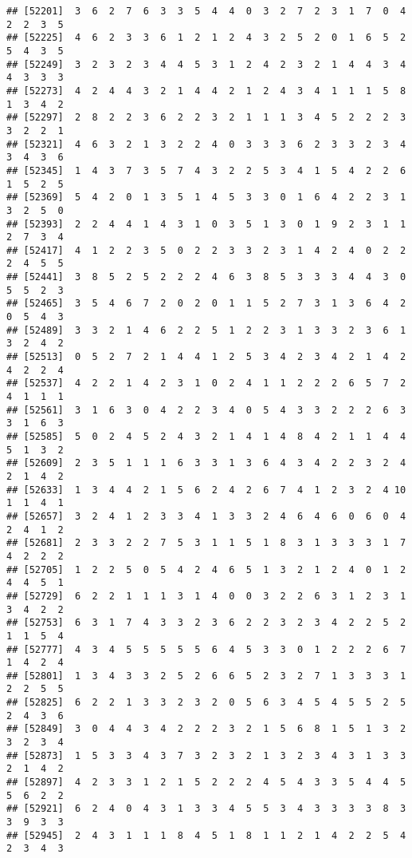 \documentclass[
]{article}
\begin{document}
\begin{verbatim}
## [52201]  3  6  2  7  6  3  3  5  4  4  0  3  2  7  2  3  1  7  0  4  2  2  3  5
## [52225]  4  6  2  3  3  6  1  2  1  2  4  3  2  5  2  0  1  6  5  2  5  4  3  5
## [52249]  3  2  3  2  3  4  4  5  3  1  2  4  2  3  2  1  4  4  3  4  4  3  3  3
## [52273]  4  2  4  4  3  2  1  4  4  2  1  2  4  3  4  1  1  1  5  8  1  3  4  2
## [52297]  2  8  2  2  3  6  2  2  3  2  1  1  1  3  4  5  2  2  2  3  3  2  2  1
## [52321]  4  6  3  2  1  3  2  2  4  0  3  3  3  6  2  3  3  2  3  4  3  4  3  6
## [52345]  1  4  3  7  3  5  7  4  3  2  2  5  3  4  1  5  4  2  2  6  1  5  2  5
## [52369]  5  4  2  0  1  3  5  1  4  5  3  3  0  1  6  4  2  2  3  1  3  2  5  0
## [52393]  2  2  4  4  1  4  3  1  0  3  5  1  3  0  1  9  2  3  1  1  2  7  3  4
## [52417]  4  1  2  2  3  5  0  2  2  3  3  2  3  1  4  2  4  0  2  2  2  4  5  5
## [52441]  3  8  5  2  5  2  2  2  4  6  3  8  5  3  3  3  4  4  3  0  5  5  2  3
## [52465]  3  5  4  6  7  2  0  2  0  1  1  5  2  7  3  1  3  6  4  2  0  5  4  3
## [52489]  3  3  2  1  4  6  2  2  5  1  2  2  3  1  3  3  2  3  6  1  3  2  4  2
## [52513]  0  5  2  7  2  1  4  4  1  2  5  3  4  2  3  4  2  1  4  2  4  2  2  4
## [52537]  4  2  2  1  4  2  3  1  0  2  4  1  1  2  2  2  6  5  7  2  4  1  1  1
## [52561]  3  1  6  3  0  4  2  2  3  4  0  5  4  3  3  2  2  2  6  3  3  1  6  3
## [52585]  5  0  2  4  5  2  4  3  2  1  4  1  4  8  4  2  1  1  4  4  5  1  3  2
## [52609]  2  3  5  1  1  1  6  3  3  1  3  6  4  3  4  2  2  3  2  4  2  1  4  2
## [52633]  1  3  4  4  2  1  5  6  2  4  2  6  7  4  1  2  3  2  4 10  1  1  4  1
## [52657]  3  2  4  1  2  3  3  4  1  3  3  2  4  6  4  6  0  6  0  4  2  4  1  2
## [52681]  2  3  3  2  2  7  5  3  1  1  5  1  8  3  1  3  3  3  1  7  4  2  2  2
## [52705]  1  2  2  5  0  5  4  2  4  6  5  1  3  2  1  2  4  0  1  2  4  4  5  1
## [52729]  6  2  2  1  1  1  3  1  4  0  0  3  2  2  6  3  1  2  3  1  3  4  2  2
## [52753]  6  3  1  7  4  3  3  2  3  6  2  2  3  2  3  4  2  2  5  2  1  1  5  4
## [52777]  4  3  4  5  5  5  5  5  6  4  5  3  3  0  1  2  2  2  6  7  1  4  2  4
## [52801]  1  3  4  3  3  2  5  2  6  6  5  2  3  2  7  1  3  3  3  1  2  2  5  5
## [52825]  6  2  2  1  3  3  2  3  2  0  5  6  3  4  5  4  5  5  2  5  2  4  3  6
## [52849]  3  0  4  4  3  4  2  2  2  3  2  1  5  6  8  1  5  1  3  2  3  2  3  4
## [52873]  1  5  3  3  4  3  7  3  2  3  2  1  3  2  3  4  3  1  3  3  2  1  4  2
## [52897]  4  2  3  3  1  2  1  5  2  2  2  4  5  4  3  3  5  4  4  5  5  6  2  2
## [52921]  6  2  4  0  4  3  1  3  3  4  5  5  3  4  3  3  3  3  8  3  3  9  3  3
## [52945]  2  4  3  1  1  1  8  4  5  1  8  1  1  2  1  4  2  2  5  4  2  3  4  3

\end{verbatim}
\end{document}
